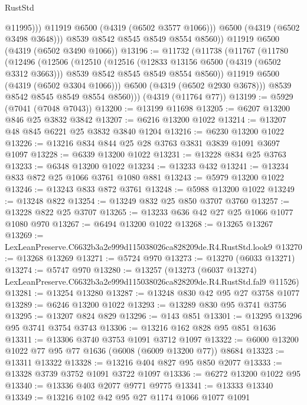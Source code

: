 \begin{lexlean}{RustStd}
\begin{coremodule}
                  @11995)))
            @11919
            @6500
            (@4319 (@6502 @3577 @1066)))
          @6500
          (@4319 (@6502 @3498 @3648)))
        @8539
        @8542
        @8545
        @8549
        @8554
        @8560))
    @11919
    @6500
    (@4319 (@6502 @3490 @1066))
@13196 := @11732
    (@11738
      (@11767
        (@11780
          (@12496
            (@12506
              (@12510
                (@12516
                  (@12833 @13156 @6500 (@4319 (@6502 @3312 @3663)))
                  @8539
                  @8542
                  @8545
                  @8549
                  @8554
                  @8560))
              @11919
              @6500
              (@4319 (@6502 @3304 @1066)))
            @6500
            (@4319 (@6502 @2930 @3678)))
          @8539
          @8542
          @8545
          @8549
          @8554
          @8560)))
    (@4319 (@11764 @77))
@13199 := @5929 (@7041 (@7048 @7043))
@13200 := @13199 @11698
@13205 := @6207 @13200 @846 @25 @3832 @3842
@13207 := @6216 @13200 @1022
@13214 := @13207 @48 @845 @6221 @25 @3832 @3840 @1204
@13216 := @6230 @13200 @1022
@13226 := @13216 @834 @844 @25 @28 @3763 @3831 @3839 @1091 @3697 @1097
@13228 := @6339 @13200 @1022
@13231 := @13228 @834 @25 @3763
@13233 := @6348 @13200 @1022
@13234 := @13233 @432
@13241 := @13234 @833 @872 @25 @1066 @3761 @1080 @881
@13243 := @5979 @13200 @1022
@13246 := @13243 @833 @872 @3761
@13248 := @5988 @13200 @1022
@13249 := @13248 @822
@13254 := @13249 @832 @25 @850 @3707 @3760
@13257 := @13228 @822 @25 @3707
@13265 := @13233 @636 @42 @27 @25 @1066 @1077 @1080 @970
@13267 := @6494 @13200 @1022
@13268 := @13265 @13267
@13269 := LexLeanPreserve.C6632b3a2e999d115038026ca828209de.R4.RustStd.look9
@13270 := @13268 @13269
@13271 := @5724 @970
@13273 := @13270 (@6033 @13271)
@13274 := @5747 @970
@13280 := @13257
    (@13273 (@6037 @13274) LexLeanPreserve.C6632b3a2e999d115038026ca828209de.R4.RustStd.fal9 @11526)
@13281 := @13254 @13280
@13287 := @13248 @830 @42 @95 @27 @3758 @1077
@13289 := @6246 @13200 @1022
@13293 := @13289 @830 @95 @3741 @3756
@13295 := @13207 @824 @829
@13296 := @143 @851
@13301 := @13295 @13296 @95 @3741 @3754 @3743
@13306 := @13216 @162 @828 @95 @851 @1636
@13311 := @13306 @3740 @3753 @1091 @3712 @1097
@13322 := @6000 @13200 @1022 @77 @95 @77 @1636 (@6008 (@6009 @13200 @77)) @8684
@13323 := @13311 @13322
@13328 := @13216 @404 @827 @95 @850 @2077
@13333 := @13328 @3739 @3752 @1091 @3722 @1097
@13336 := @6272 @13200 @1022 @95
@13340 := @13336 @403 @2077 @9771 @9775
@13341 := @13333 @13340
@13349 := @13216 @102 @42 @95 @27 @1174 @1066 @1077 @1091

\end{coremodule}
\end{lexlean}
